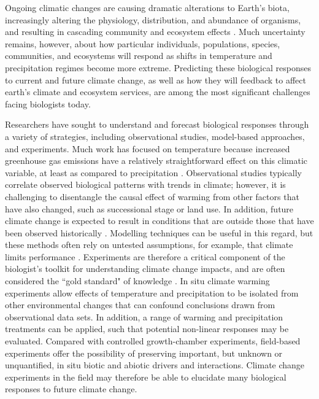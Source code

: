 \documentclass{article}
\begin{document}
\par Ongoing climatic changes are causing dramatic alterations to Earth's biota, increasingly altering the physiology, distribution, and abundance of organisms, and resulting in cascading community and ecosystem effects \citep{shukla1982,cox2000,thomas2004,parmesan2006,field2007,sheldon2011,urban2012}.  Much uncertainty remains, however, about how particular individuals, populations, species, communities, and ecosystems will respond as shifts in temperature and precipitation regimes become more extreme. Predicting these biological responses to current and future climate change, as well as how they will feedback to affect earth's climate and ecosystem services, are among the most significant challenges facing biologists today.
\par Researchers have sought to understand and forecast biological responses through a variety of strategies, including observational studies, model-based approaches, and experiments. Much work has focused on temperature because increased greenhouse gas emissions have a relatively straightforward effect on this climatic variable, at least as compared to precipitation \citep{ipcc2013}. Observational studies typically correlate observed biological patterns with trends in climate; however, it is challenging to disentangle the causal effect of warming from other factors that have also changed, such as successional stage or land use. In addition, future climate change is expected to result in conditions that are outside those that have been observed historically \citep{ohlemuller2006,williams2007,williams2007b,ipcc2013}. Modelling techniques can be useful in this regard, but these methods often rely on untested assumptions, for example, that climate limits performance \citep{pearson2004,ibanez2006,swab2012}. Experiments are therefore a critical component of the biologist's toolkit for understanding climate change impacts, and are often considered the ``gold standard" of knowledge \citep[e.g.][]{box1978,gelman2014}. In situ climate warming experiments allow effects of temperature and  precipitation to be isolated from other  environmental changes that can confound conclusions drawn from observational data sets. In addition, a range of warming  and precipitation treatments can be applied, such that potential non-linear responses may be evaluated. Compared with controlled growth-chamber experiments, field-based experiments offer the possibility of preserving important, but unknown or unquantified, in situ biotic and abiotic drivers and interactions. Climate change experiments in the field may therefore be able to elucidate many biological responses to future climate change.
\end{document}
